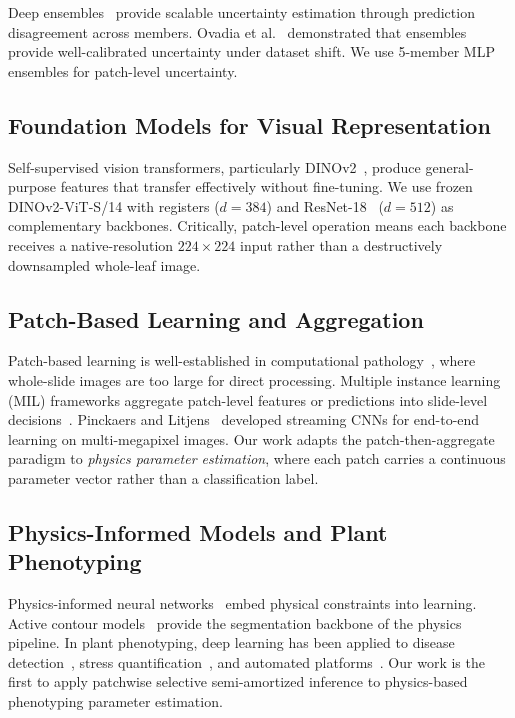 \documentclass[11pt,a4paper]{article}
\begin{document}
Deep ensembles~\cite{lakshminarayanan2017simple} provide scalable uncertainty
estimation through prediction disagreement across members.
Ovadia et al.~\cite{ovadia2019can} demonstrated that ensembles provide
well-calibrated uncertainty under dataset shift.
We use 5-member MLP ensembles for patch-level uncertainty.

\subsection{Foundation Models for Visual Representation}

Self-supervised vision transformers, particularly
DINOv2~\cite{oquab2024dinov2,darcet2024vision},
produce general-purpose features that transfer effectively without fine-tuning.
We use frozen DINOv2-ViT-S/14 with registers ($d{=}384$) and
ResNet-18~\cite{he2016deep} ($d{=}512$) as complementary backbones.
Critically, patch-level operation means each backbone receives a
native-resolution $224{\times}224$ input rather than a destructively
downsampled whole-leaf image.

\subsection{Patch-Based Learning and Aggregation}

Patch-based learning is well-established in computational
pathology~\cite{campanella2019clinical,lu2021data,ilse2018attention},
where whole-slide images are too large for direct processing.
Multiple instance learning (MIL) frameworks aggregate patch-level
features or predictions into slide-level
decisions~\cite{ilse2018attention,li2021dual}.
Pinckaers and Litjens~\cite{pinckaers2020streaming} developed streaming
CNNs for end-to-end learning on multi-megapixel images.
Our work adapts the patch-then-aggregate paradigm to \emph{physics parameter
estimation}, where each patch carries a continuous parameter vector
rather than a classification label.

\subsection{Physics-Informed Models and Plant Phenotyping}

Physics-informed neural networks~\cite{raissi2019physics,karniadakis2021physics}
embed physical constraints into learning.
Active contour models~\cite{kass1988snakes,chan2001active} provide the
segmentation backbone of the physics pipeline.
In plant phenotyping, deep learning has been applied to disease
detection~\cite{mutka2015image,mahlein2016plant,barbedo2018factors},
stress quantification~\cite{singh2021plantdoc}, and automated
platforms~\cite{ubbens2017deep,li2021review}.
Our work is the first to apply patchwise selective semi-amortized inference
to physics-based phenotyping parameter estimation.
\end{document}
